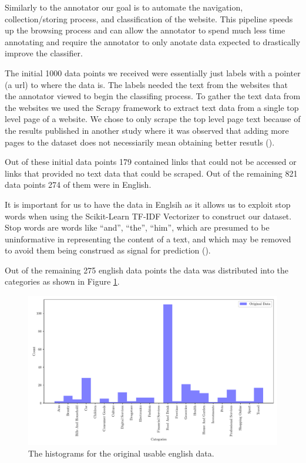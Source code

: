 Similarly to the annotator our goal is to automate the navigation, collection/storing process, and classification of the website. This pipeline speeds up the browsing process and can allow the annotator to spend much less time annotating and require the annotator to only anotate data expected to drastically improve the classifier.

The initial 1000 data points we received were essentially just labels with a pointer (a url) to where the data is. The labels needed the text from the websites that the annotator viewed to begin the classifing process. To gather the text data from the websites we used the Scrapy framework to extract text data from a single top level page of a website. We chose to only scrape the top level page text because
of the results published in another study where it was observed that adding more pages to the dataset does not necessiarily mean obtaining better resutls (\cite{sahid2019ecommerce}). 

Out of these initial data points 179 contained links that could not be accessed or links that provided no text data that could be scraped. Out of the remaining 821 data points 274 of them were in English. 

It is important for us to have the data in Englsih as it allows us to exploit stop words when using the Scikit-Learn TF-IDF Vectorizer to construct our dataset. Stop words are words like “and”, “the”, “him”, which are presumed to be uninformative in representing the content of a text, and which may be removed to avoid them being construed as signal for prediction (\cite{sklearn62feature}).

Out of the remaining 275 english data points the data was distributed into the categories as shown in Figure \ref{fig:og_en_hist}.

\begin{figure}[!ht]
  \centering
  \includegraphics[width=\textwidth]{../img/plot_og_en_hist.pdf}
  \caption{The histograms for the original usable english data.}
  \label{fig:og_en_hist}
\end{figure}

